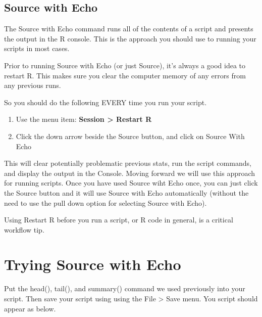 \documentclass[
]{krantz}
\makeatletter
\providecommand{\tightlist}{%
  \setlength{\itemsep}{0pt}\setlength{\parskip}{0pt}}
\newenvironment{kframe}{%
\medskip{}
\setlength{\fboxsep}{.8em}
 \def\at@end@of@kframe{}%
 \ifinner\ifhmode%
  \def\at@end@of@kframe{\end{minipage}}%
  \begin{minipage}{\columnwidth}%
 \fi\fi%
 \def\FrameCommand##1{\hskip\@totalleftmargin \hskip-\fboxsep
 \colorbox{shadecolor}{##1}\hskip-\fboxsep
     \hskip-\linewidth \hskip-\@totalleftmargin \hskip\columnwidth}%
 \MakeFramed {\advance\hsize-\width
   \@totalleftmargin\z@ \linewidth\hsize
   \@setminipage}}%
 {\par\unskip\endMakeFramed%
 \at@end@of@kframe}
\newenvironment{rmdblock}[1]
  {
  \begin{itemize}
  \renewcommand{\labelitemi}{
    \raisebox{-.7\height}[0pt][0pt]{
      {\setkeys{Gin}{width=3em,keepaspectratio}\texttt{[image: images/\#1]}}
    }
  }
  \setlength{\fboxsep}{1em}
  \begin{kframe}
  \item
  }
  {
  \end{kframe}
  \end{itemize}
  }
\newenvironment{rmdcaution}
  {\begin{rmdblock}{caution}}
  {\end{rmdblock}}
\makeatother
\begin{document}
\hypertarget{source-with-echo}{%
\subsection{Source with Echo}\label{source-with-echo}}

The Source with Echo command runs all of the contents of a script and presents the output in the R console. This is the approach you should use to running your scripts in most cases.

Prior to running Source with Echo (or just Source), it's always a good idea to restart R. This makes sure you clear the computer memory of any errors from any previous runs.

So you should do the following EVERY time you run your script.

\begin{enumerate}
\def\labelenumi{\arabic{enumi}.}
\tightlist
\item
  Use the menu item: \textbf{Session \textgreater{} Restart R}
\item
  Click the down arrow beside the Source button, and click on Source With Echo
\end{enumerate}

This will clear potentially problematic previous stats, run the script commands, and display the output in the Console. Moving forward we will use this approach for running scripts. Once you have used Source wiht Echo once, you can just click the Source button and it will use Source with Echo automatically (without the need to use the pull down option for selecting Source with Echo).

\begin{rmdcaution}
\begin{rmdcaution}

Using Restart R before you run a script, or R code in general, is a critical workflow tip.

\end{rmdcaution}
\end{rmdcaution}

\hypertarget{trying-source-with-echo}{%
\section{Trying Source with Echo}\label{trying-source-with-echo}}

Put the head(), tail(), and summary() command we used previously into your script. Then save your script using using the File \textgreater{} Save menu. You script should appear as below.
\end{document}
